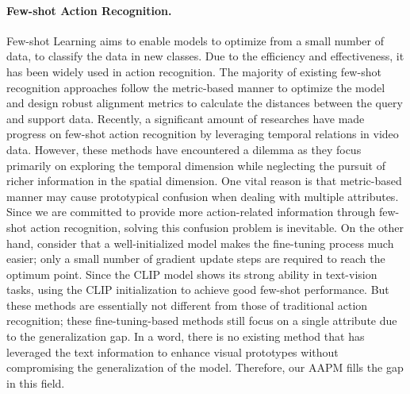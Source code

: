 \paragraph{Few-shot Action Recognition.}
Few-shot Learning \cite{fei2006one} aims to enable models to optimize from a small number of data, to classify the data in new classes. Due to the efficiency and effectiveness, it has been widely used in action recognition. The majority of existing few-shot recognition approaches \cite{snell2017prototypical,vinyals2016matching,sung2018learning,li2019finding} follow the metric-based manner to optimize the model and design robust alignment metrics to calculate the distances between the query and support data. 
Recently, a significant amount of researches \cite{cao2020few,perrett2021temporal,kong2022human,thatipelli2022spatio} have made progress on few-shot action recognition by leveraging temporal relations in video data. However, these methods have encountered a dilemma as they focus primarily on exploring the temporal dimension while neglecting the pursuit of richer information in the spatial dimension. 
One vital reason is that metric-based manner may cause prototypical confusion when dealing with multiple attributes. Since we are committed to provide more action-related information through few-shot action recognition, solving this confusion problem is inevitable.
On the other hand, \cite{rusu2018meta,rajeswaran2019meta,finn2017model} consider that a well-initialized model makes the fine-tuning process much easier; only a small number of gradient update steps are required to reach the optimum point. Since the CLIP model shows its strong ability in text-vision tasks, \cite{zhou2022learning,gao2024clip,wang2021actionclip,ni2022expanding} using the CLIP initialization to achieve good few-shot performance. But these methods are essentially not different from those of traditional action recognition; these fine-tuning-based methods still focus on a single attribute due to the generalization gap. In a word, there is no existing method that has leveraged the text information to enhance visual prototypes without compromising the generalization of the model. Therefore, our AAPM fills the gap in this field.


